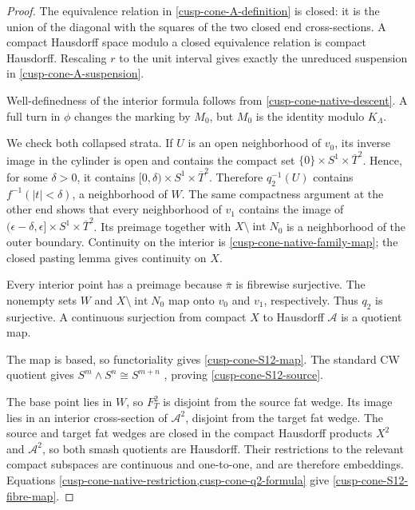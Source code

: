 \begin{proof}
The equivalence relation in \cref{cusp-cone-A-definition} is closed: it is
the union of the diagonal with the squares of the two closed end
cross-sections.  A compact Hausdorff space modulo a closed equivalence
relation is compact Hausdorff.  Rescaling \(r\) to the unit interval gives
exactly the unreduced suspension in \cref{cusp-cone-A-suspension}.

Well-definedness of the interior formula follows from
\cref{cusp-cone-native-descent}.  A full turn in \(\phi\) changes the
marking by \(M_0\), but \(M_0\) is the identity modulo \(K_\Lambda\).

We check both collapsed strata.  If \(U\) is an open neighborhood of
\(v_0\), its inverse image in the cylinder is open and contains the compact
set \(\{0\}\times S^1\times\overline T^2\).  Hence, for some \(\delta>0\),
it contains
\([0,\delta)\times S^1\times\overline T^2\).  Therefore
\(q_2^{-1}(U)\) contains \(f^{-1}(|t|<\delta)\), a neighborhood of \(W\).
The same compactness argument at the other end shows that every neighborhood
of \(v_1\) contains the image of
\((\epsilon-\delta,\epsilon]\times S^1\times\overline T^2\).  Its preimage
together with \(X\setminus\operatorname{int}N_0\) is a neighborhood of the
outer boundary.  Continuity on the interior is
\cref{cusp-cone-native-family-map}; the closed pasting lemma gives
continuity on \(X\).

Every interior point has a preimage because \(\overline\pi\) is fibrewise
surjective.  The nonempty sets \(W\) and
\(X\setminus\operatorname{int}N_0\) map onto \(v_0\) and \(v_1\),
respectively.  Thus \(q_2\) is surjective.  A continuous surjection from
compact \(X\) to Hausdorff \(\mathcal A\) is a quotient map.

The map is based, so functoriality gives \cref{cusp-cone-S12-map}.  The
standard CW quotient gives \(S^m\wedge S^n\cong S^{m+n}\)
\cite[Chapter~0, Smash Product]{Hatcher2002}, proving
\cref{cusp-cone-S12-source}.

The base point lies in \(W\), so \(F_T^2\) is disjoint from the source fat
wedge.  Its image lies in an interior cross-section of
\(\mathcal A^2\), disjoint from the target fat wedge.  The source and target
fat wedges are closed in the compact Hausdorff products \(X^2\) and
\(\mathcal A^2\), so both smash quotients are Hausdorff.  Their restrictions
to the relevant compact subspaces are continuous and one-to-one, and are
therefore embeddings.
Equations \cref{cusp-cone-native-restriction,cusp-cone-q2-formula} give
\cref{cusp-cone-S12-fibre-map}.


\end{proof}
